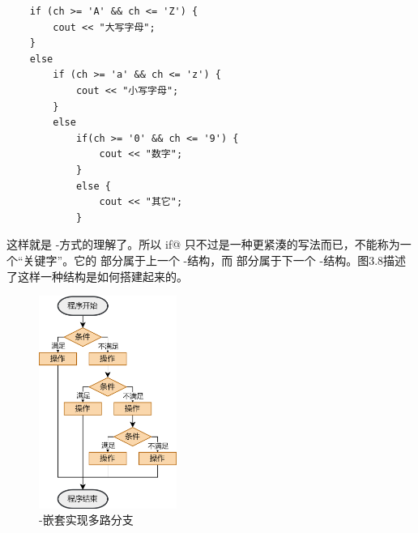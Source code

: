 \begin{lstlisting}
    if (ch >= 'A' && ch <= 'Z') {
        cout << "大写字母";
    }
    else
        if (ch >= 'a' && ch <= 'z') {
            cout << "小写字母";
        }
        else
            if(ch >= '0' && ch <= '9') {
                cout << "数字";
            }
            else {
                cout << "其它";
            }
\end{lstlisting}
这样就是 \lstinline@if@-\lstinline@else@ 方式的理解了。所以 \lstinline@else if@ 只不过是一种更紧湊的写法而已，不能称为一个``关键字''。它的 \lstinline@else@ 部分属于上一个 \lstinline@if@-\lstinline@else@ 结构，而 \lstinline@if@ 部分属于下一个 \lstinline@if@-\lstinline@else@ 结构。图3.8描述了这样一种结构是如何搭建起来的。\par
\begin{figure}[htbp]
    \centering
    \includegraphics[width=0.4\textwidth]{../images/generalized_parts/03_if_elseif_else.drawio.png}
    \caption{\lstinline@if@-\lstinline@else@ 嵌套实现多路分支}
\end{figure}
